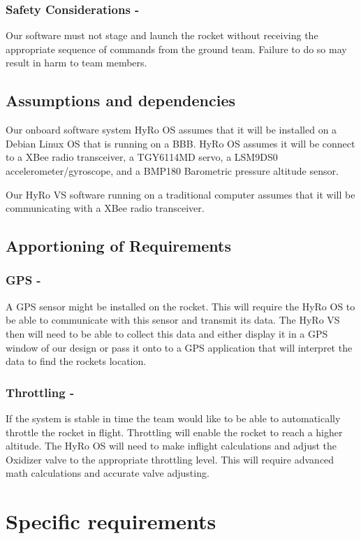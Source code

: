 \documentclass[10pt,draftclsnofoot,onecolumn,compsoc]{IEEEtran}
\begin{document}
\subsubsection{Safety Considerations -} Our software must not stage and launch the rocket without receiving the appropriate sequence of commands from the ground team. Failure to do so may result in harm to team members.

\subsection{Assumptions and dependencies}
Our onboard software system HyRo OS assumes that it will be installed on a Debian Linux OS that is running on a BBB.  HyRo OS assumes it will be connect to a XBee radio transceiver, a TGY6114MD servo, a LSM9DS0 accelerometer/gyroscope, and a BMP180 Barometric pressure altitude sensor.\par
	Our HyRo VS software running on a traditional computer assumes that it will be communicating with a XBee radio transceiver.

\subsection{Apportioning of Requirements}
\subsubsection{GPS -} A GPS sensor might be installed on the rocket. This will require the HyRo OS to be able to communicate with this sensor and transmit its data. The HyRo VS then will need to be able to collect this data and either display it in a GPS window of our design or pass it onto to a GPS application that will interpret the data to find the rockets location.
\subsubsection{Throttling -} If the system is stable in time the team would like to be able to automatically throttle the rocket in flight. Throttling will enable the rocket to reach a higher altitude. The HyRo OS will need to make inflight calculations and adjust the Oxidizer valve to the appropriate throttling level. This will require advanced math calculations and accurate valve adjusting.

\section{ Specific requirements}
\end{document}
